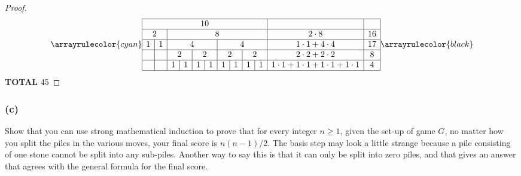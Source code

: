 \documentclass[14pt]{extarticle}
\begin{document}
\begin{proof}
    \[
        \arrayrulecolor{cyan}
        \begin{array}{|c|c|c|c|c|c|c|c|c|c|c|c|}
            \hline
            \multicolumn{10}{|c|}{10} &                         &                                                                                                                                                                                           \\
            \hline
            \multicolumn{2}{|c}{2}    & \multicolumn{8}{|c|}{8} & 2 \cdot 8              & 16                                                                                                                                                               \\
            \hline
            1                         & 1                       & \multicolumn{4}{c|}{4} & \multicolumn{4}{c|}{4} & 1 \cdot 1 + 4 \cdot 4  & 17                                                                                                             \\
            \hline
                                      &                         & \multicolumn{2}{c|}{2} & \multicolumn{2}{c|}{2} & \multicolumn{2}{c|}{2} & \multicolumn{2}{c|}{2} & 2 \cdot 2 + 2 \cdot 2 & 8                                                             \\
            \hline
                                      &                         & 1                      & 1                      & 1                      & 1                      & 1                     & 1 & 1 & 1 & 1 \cdot 1 + 1 \cdot 1 + 1 \cdot 1 + 1 \cdot 1 & 4 \\
            \hline
        \end{array}
        \arrayrulecolor{black}
    \]
    {\bf TOTAL} 45
\end{proof}

\subsubsection{(c)}
Show that you can use strong mathematical induction to prove that for every integer $n \geq 1$, given the set-up of game $G$, no matter how you split the piles in the various moves, your final score is $n(n - 1)/2$. The basis step may look a little strange because a pile consisting of one stone cannot be split into any sub-piles. Another way to say this is that it can only be split into zero piles, and that gives an answer that agrees with the general formula for the final score.
\end{document}
